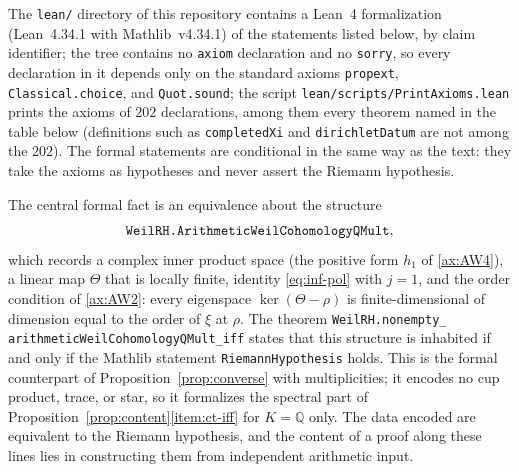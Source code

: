 \documentclass[11pt]{amsart}
\theoremstyle{plain}
\theoremstyle{definition}
\theoremstyle{remark}
\numberwithin{equation}{section}
\newcommand{\Q}{\mathbb{Q}}
\begin{document}
The \texttt{lean/} directory of this repository contains a Lean~4
formalization (Lean~4.34.1 with Mathlib~v4.34.1) of the statements
listed below, by claim identifier; the tree contains no
\texttt{axiom} declaration and no \texttt{sorry}, so every declaration
in it depends only on the standard axioms \texttt{propext},
\texttt{Classical.choice}, and \texttt{Quot.sound}; the script
\texttt{lean/scripts/PrintAxioms.lean} prints the axioms of $202$
declarations, among them every theorem named in the table below
(definitions such as \texttt{completedXi} and \texttt{dirichletDatum}
are not among the $202$).
 The formal
statements are conditional in the same way as the text: they take the
axioms as hypotheses and never assert the Riemann hypothesis.

The central formal fact is an equivalence about the structure
\[
\text{\texttt{WeilRH.ArithmeticWeilCohomologyQMult}},
\]
which records a complex inner product space (the positive form $h_1$ of
\ref{ax:AW4}), a linear map
$\Theta$ that is locally finite, identity \eqref{eq:inf-pol} with
$j=1$, and the order condition of \ref{ax:AW2}: every eigenspace
$\ker(\Theta-\rho)$ is finite-dimensional of dimension equal to the
order of $\xi$ at $\rho$. The theorem
\texttt{WeilRH.\allowbreak{}nonempty\_\allowbreak{}%
arithmeticWeil\allowbreak{}CohomologyQMult\_\allowbreak{}iff} states
that this structure is inhabited if and only if the Mathlib
statement \texttt{Riemann\allowbreak{}Hypothesis} holds. This is the
formal counterpart of Proposition~\ref{prop:converse} with
multiplicities; it encodes no cup product, trace, or star, so it
formalizes the spectral part of
Proposition~\ref{prop:content}\ref{item:ct-iff} for $K=\Q$ only. The
data encoded are equivalent to the Riemann hypothesis, and the content of a
proof along these lines lies in constructing them from independent
arithmetic input.
\end{document}
